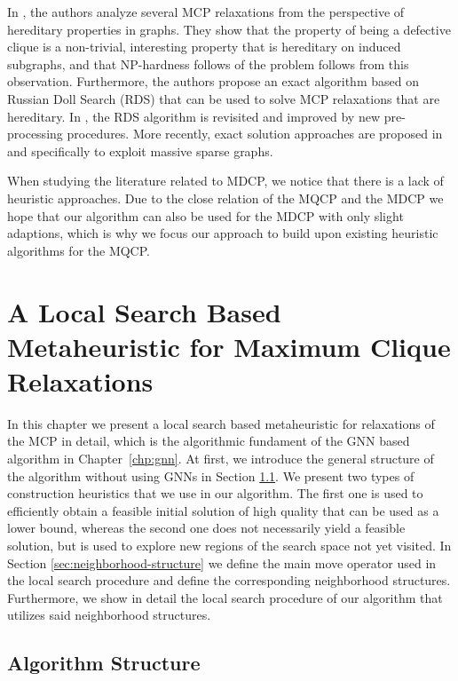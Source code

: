 \documentclass[draft,final]{vutinfth} %
\begin{document}
In \cite{Trukhanov2013}, the authors analyze several MCP relaxations from the perspective of hereditary properties in graphs. They show that the property of being a defective clique is a non-trivial, interesting property that is hereditary on induced subgraphs, and that NP-hardness follows of the problem follows from this observation. Furthermore, the authors propose an exact algorithm based on Russian Doll Search (RDS) that can be used to solve MCP relaxations that are hereditary. In \cite{GSCHWIND2018131}, the RDS algorithm is revisited and improved by new pre-processing procedures. 
More recently, exact solution approaches are proposed in \cite{chen2021computing} and \cite{gao2022exact} specifically to exploit massive sparse graphs. 

When studying the literature related to MDCP, we notice that there is a lack of heuristic approaches. Due to the close relation of the MQCP and the MDCP we hope that our algorithm can also be used for the MDCP with only slight adaptions, which is why we focus our approach to build upon existing heuristic algorithms for the MQCP. 

\chapter{A Local Search Based Metaheuristic for Maximum Clique Relaxations}\label{chp:local-search-algorithm}

In this chapter we present a local search based metaheuristic for relaxations of the MCP in detail, which is the algorithmic fundament of the GNN based algorithm in Chapter~\ref{chp:gnn}.
At first, we introduce the general structure of the algorithm without using GNNs in Section \ref{sec:algorithm-structure}. We present two types of construction heuristics that we use in our algorithm. The first one is used to efficiently obtain a feasible initial solution of high quality that can be used as a lower bound, whereas the second one does not necessarily yield a feasible solution, but is used to explore new regions of the search space not yet visited. In Section \ref{sec:neighborhood-structure} we define the main move operator used in the local search procedure and define the corresponding neighborhood structures. Furthermore, we show in detail the local search procedure of our algorithm that utilizes said neighborhood structures. 

\section{Algorithm Structure} \label{sec:algorithm-structure}
\end{document}
